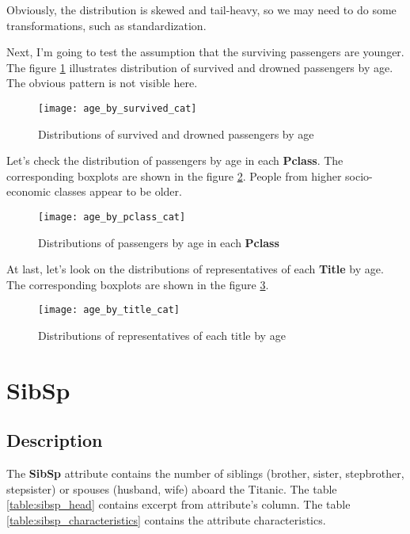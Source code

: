 Obviously, the distribution is skewed and tail-heavy, so we may need to 
do some transformations, such as standardization.

Next, I'm going to test the assumption that the surviving passengers are 
younger. The figure \ref{pic:age_by_survived_cat} illustrates distribution 
of survived and drowned passengers by age. The obvious pattern is not 
visible here.

\begin{figure}[!hp]
    \centering
    \texttt{[image: age\_by\_survived\_cat]}
    \caption{Distributions of survived and drowned passengers by age}
    \label{pic:age_by_survived_cat}
\end{figure}

Let's check the distribution of passengers by age in each \textbf{Pclass}.
The corresponding boxplots are shown in the figure \ref{pic:age_by_pclass_cat}.
People from higher socio-economic classes appear to be older.

\begin{figure}[!hp]
    \centering
    \texttt{[image: age\_by\_pclass\_cat]}
    \caption{Distributions of passengers by age in each \textbf{Pclass}}
    \label{pic:age_by_pclass_cat}
\end{figure}

At last, let's look on the distributions of representatives of each 
\textbf{Title} by age. The corresponding boxplots are shown in the figure 
\ref{pic:age_by_title_cat}.

\begin{figure}[!hp]
    \centering
    \texttt{[image: age\_by\_title\_cat]}
    \caption{Distributions of representatives of each title by age}
    \label{pic:age_by_title_cat}
\end{figure}


\section{SibSp} \label{section:SibSp}
\subsection{Description}
The \textbf{SibSp} attribute contains the number of siblings (brother, 
sister, stepbrother, stepsister) or spouses (husband, wife) aboard the 
Titanic. The table \ref{table:sibsp_head} contains excerpt from 
attribute's column. The table \ref{table:sibsp_characteristics} contains
the attribute characteristics.

